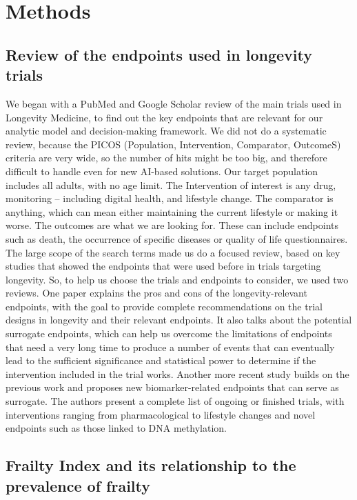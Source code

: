 
\section{Methods}

\subsection{Review of the endpoints used in longevity trials}

We began with a PubMed and Google Scholar review of the main trials used in Longevity Medicine, to find out the key endpoints that are relevant for our analytic model and decision-making framework. We did not do a systematic review, because the PICOS (Population, Intervention, Comparator, OutcomeS) criteria are very wide, so the number of hits might be too big, and therefore difficult to handle even for new AI-based solutions. Our target population includes all adults, with no age limit. The Intervention of interest is any drug, monitoring -- including digital health, and lifestyle change. The comparator is anything, which can mean either maintaining the current lifestyle or making it worse. The outcomes are what we are looking for. These can include endpoints such as death, the occurrence of specific diseases or quality of life questionnaires. The large scope of the search terms made us do a focused review, based on key studies that showed the endpoints that were used before in trials targeting longevity. So, to help us choose the trials and endpoints to consider, we used two reviews. One paper explains the pros and cons of the longevity-relevant endpoints, with the goal to provide complete recommendations on the trial designs in longevity and their relevant endpoints. It also talks about the potential surrogate endpoints, which can help us overcome the limitations of endpoints that need a very long time to produce a number of events that can eventually lead to the sufficient significance and statistical power to determine if the intervention included in the trial works\cite{Cummings2022}. Another more recent study builds on the previous work and proposes new biomarker-related endpoints that can serve as surrogate. The authors present a complete list of ongoing or finished trials, with interventions ranging from pharmacological to lifestyle changes and novel endpoints such as those linked to DNA methylation\cite{Moqri2023}.

\subsection{Frailty Index and its relationship to the prevalence of frailty}

